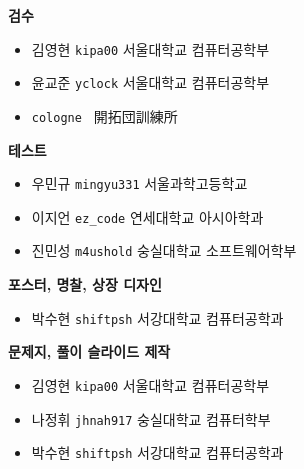     \begin{frame}%
        \textbf{검수} %
        \begin{itemize}
            \item 김영현 \tabto{1.5cm} \texttt{kipa00} \tabto{8cm} {\color{gray} 서울대학교 컴퓨터공학부}
            \item 윤교준 \tabto{1.5cm} \texttt{yclock} \tabto{8cm} {\color{gray} 서울대학교 컴퓨터공학부}
            \item {} \tabto{1.5cm} \texttt{cologne } \tabto{4cm} {\color{gray} } \tabto{8cm} {\color{gray} 開拓団訓練所}
        \end{itemize}
        \vspace{3mm}
        \textbf{테스트} %
        \begin{itemize}
            \item 우민규 \tabto{1.5cm} \texttt{mingyu331} \tabto{8cm} {\color{gray} 서울과학고등학교}
            \item 이지언 \tabto{1.5cm} \texttt{ez\_code} \tabto{8cm} {\color{gray} 연세대학교 아시아학과}
            \item 진민성 \tabto{1.5cm} \texttt{m4ushold} \tabto{8cm} {\color{gray} 숭실대학교 소프트웨어학부}
        \end{itemize}
    \end{frame}

    \begin{frame}%
        \textbf{포스터, 명찰, 상장 디자인} %
        \begin{itemize}
            \item 박수현 \tabto{1.5cm} \texttt{shiftpsh} \tabto{8cm} {\color{gray} 서강대학교 컴퓨터공학과}
        \end{itemize}
        \vspace{3mm}
        \textbf{문제지, 풀이 슬라이드 제작} %
        \begin{itemize}
            \item 김영현 \tabto{1.5cm} \texttt{kipa00} \tabto{8cm} {\color{gray} 서울대학교 컴퓨터공학부}
            \item 나정휘 \tabto{1.5cm} \texttt{jhnah917} \tabto{4cm} {\color{gray} } \tabto{8cm} {\color{gray} 숭실대학교 컴퓨터학부}
            \item 박수현 \tabto{1.5cm} \texttt{shiftpsh} \tabto{8cm} {\color{gray} 서강대학교 컴퓨터공학과}
        \end{itemize}
    \end{frame}
    

